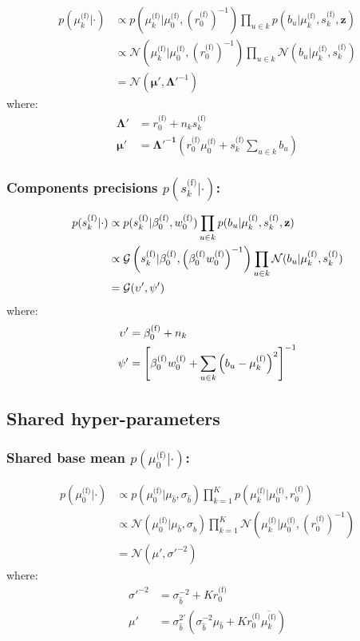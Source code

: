 \documentclass[smallextended]{svjour3}          %
\newcommand\alberto[1]{\textcolor{black}{#1}}
\newcommand{\muo}{\mu_{0}^\text{(f)}}
\newcommand{\ro}{r_{0}^\text{(f)}}
\newcommand{\invro}{\left(r_{0}^\text{(f)}\right)^{-1}}
\newcommand{\wo}{w_{0}^\text{(f)}}
\newcommand{\betaof}{\beta_{0}^\text{(f)}}
\newcommand{\muk}{\mu_{k}^\text{(f)}}
\newcommand{\sk}{s_{k}^\text{(f)}}
\begin{document}
\begin{align*}
p(\muk | \cdot ) 
&\propto
p\left(\muk | \muo, \invro\right) 
\prod_{u \in k} p(b_u | \muk, \sk, \mathbf{z})\\
&\propto
\mathcal{N}\left(\muk | \muo, \invro\right) 
\prod_{u \in k} \mathcal{N}(b_u | \muk, \sk)\\
&=\mathcal{N}(\boldsymbol{\mu'}, \boldsymbol{\Lambda'}^{-1})
\end{align*}
where:
\begin{align*}
\boldsymbol{\Lambda'} &= \ro + n_k \sk\\ 
\boldsymbol{\mu'} &= \boldsymbol{\Lambda'^{-1}} \left(\ro \muo + \sk \sum_{u\in k} b_u\right)
\end{align*}


\subsubsection*{Components precisions $p(\sk | \cdot )$:}
\begin{align*}
p(\sk | \cdot ) 
&\propto 
p(\sk |\betaof, \wo)
\prod_{u \in k} p(b_u | \muk, \sk, \mathbf{z})\\
&\propto
\mathcal{G}\left(\sk |\betaof, \alberto{\left(\betaof\wo\right)^{-1}}\right)
\prod_{u \in k} \mathcal{N}(b_u | \muk, \sk)\\
&=
\mathcal{G}(\upsilon', \psi')
\end{align*}
where:
\begin{align*}
\upsilon' &= \betaof + n_k\\
\psi' &=
\alberto{
\left[ \betaof \wo + \sum_{u \in k} \left(b_u - \muk\right)^2  \right]^{-1}}
\end{align*}

\subsection{Shared hyper-parameters}
\subsubsection*{Shared base mean $p(\muo | \cdot)$:}
\begin{align*}
p(\muo | \cdot) 
&\propto  
p(\muo | \mu_{\hat{b}}, \sigma_{\hat{b}})
\prod_{k = 1}^K p(\muk | \muo, \ro )  \\
&\propto
\mathcal{N}(\muo | \mu_{\hat{b}}, \sigma_{\hat{b}})
\prod_{k = 1}^K\mathcal{N}\left(\muk | \muo, \invro\right)  \\
&= \mathcal{N}(\mu', \sigma'^{-2})
\end{align*}
where:
\begin{align*}
\sigma'^{-2} &= \sigma_{\hat{b}}^{-2} + K \ro\\ 
\mu' &= \sigma_{\hat{b}}^{2'} (\sigma_{\hat{b}}^{-2} 
\mu_{\hat{b}} + K \ro \overline{\muk})
\end{align*}
\end{document}
